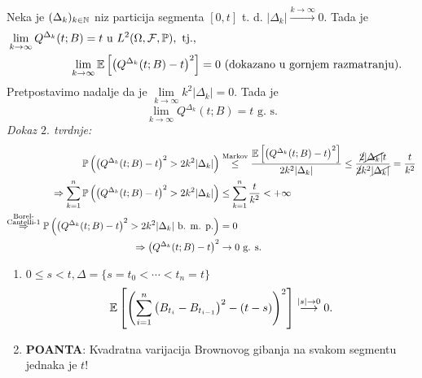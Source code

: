 \documentclass{article}
\begin{document}
Neka je \((\Delta_k)_{k\in\Bbb N}\) niz particija segmenta \([0,t]\) t. d. \(|\Delta_k|\overset{k\to\infty}{\longrightarrow}0.\) Tada je \[\begin{aligned}\lim_{k\to\infty}Q^{\Delta_k}(t;B)=t\text{ u }L^2(\Omega,\mathcal F,\Bbb P),\text{ tj., }\\\lim_{k\to\infty}\Bbb E\left[\left(Q^{\Delta_k}(t;B)-t\right)^2\right]&=0\text{ (dokazano u gornjem razmatranju)}.\end{aligned}\] Pretpostavimo nadalje da je \(\lim\limits_{k\to\infty}k^2|\Delta_k|=0.\) Tada je \[\lim\limits_{k\to\infty}Q^{\Delta_k}(t;B)=t\text{ g. s.}\]
\textit{Dokaz \(2.\) tvrdnje:} \[\begin{aligned}\Bbb P\left(\left(Q^{\Delta_k}(t;B)-t\right)^2>2k^2|\Delta_k|\right)&\overset{\text{Markov}}{\le}\frac{\Bbb E\left[\left(Q^{\Delta_k}(t;B)-t\right)^2\right]}{2k^2|\Delta_k|}\le\frac{\cancel{2}\cancel{|\Delta_k|}t}{\cancel{2}k^2\cancel{|\Delta_k|}}=\frac{t}{k^2}\\\Rightarrow\sum_{k=1}^n\Bbb P\left(\left(Q^{\Delta_k}(t;B)-t\right)^2>2k^2|\Delta_k|\right)&\le\sum_{k=1}^n\frac{t}{k^2}<+\infty\\\overset{\substack{\text{Borel-}\\\text{Cantelli-1}}}{\Rightarrow}\Bbb P\left(\left(Q^{\Delta_k}(t;B)-t\right)^2>2k^2|\Delta_k|\text{ b. m. p.}\right)&=0\\\Rightarrow\left(Q^{\Delta_k}(t;B)-t\right)^2&\to0\text{ g. s.}\end{aligned}\] 
\begin{enumerate}
    \item[\ding{113}] \(0\le s<t,\Delta=\{s=t_0<\cdots<t_n=t\}\) \[\Bbb E\left[\left(\sum_{i=1}^n\left(B_{t_i}-B_{t_{i-1}}\right)^2-(t-s)\right)^2\right]\overset{|s|\to0}{\longrightarrow}0.\] 
    \item[\ding{113}] \textbf{POANTA}: Kvadratna varijacija Brownovog gibanja na svakom segmentu jednaka je \(t\)!
\end{enumerate}
\end{document}
